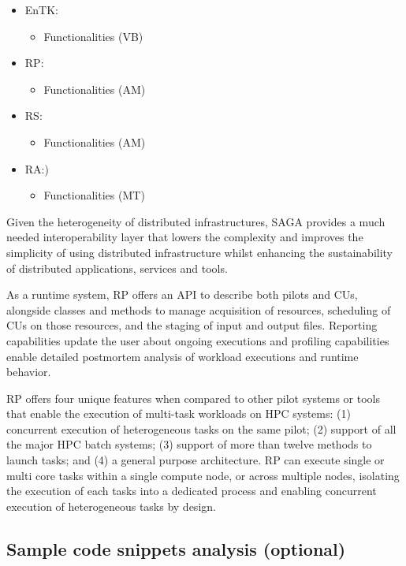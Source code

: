 \documentclass[preprint,12pt, a4paper]{elsarticle}
\begin{document}
\begin{itemize}
  \item EnTK\@:
  \begin{itemize}
    \item Functionalities (VB)
  \end{itemize}
  \item RP\@: 
  \begin{itemize}
    \item Functionalities (AM)
  \end{itemize}
  \item RS\@:
  \begin{itemize}
    \item Functionalities (AM)
  \end{itemize}
  \item RA\@:)
  \begin{itemize}
    \item Functionalities (MT)
  \end{itemize}
\end{itemize}

Given the heterogeneity of distributed infrastructures, SAGA provides a much
needed interoperability layer that lowers the complexity and improves the
simplicity of using distributed infrastructure whilst enhancing the
sustainability of distributed applications, services and tools.

As a runtime system, RP offers an API to describe both pilots and CUs,
alongside classes and methods to manage acquisition of resources, scheduling
of CUs on those resources, and the staging of input and output files.
Reporting capabilities update the user about ongoing executions and profiling
capabilities enable detailed postmortem analysis of workload executions and
runtime behavior.

RP offers four unique features when compared to other pilot systems or tools
that enable the execution of multi-task workloads on HPC systems: (1)
concurrent execution of heterogeneous tasks on the same pilot; (2) support of
all the major HPC batch systems; (3) support of more than twelve methods to
launch tasks; and (4) a general purpose architecture. RP can execute single
or multi core tasks within a single compute node, or across multiple nodes, 
isolating the execution of each tasks into a dedicated process and enabling
concurrent execution of heterogeneous tasks by design.

\subsection{Sample code snippets analysis (optional)}\label{ssec:code}
\end{document}
